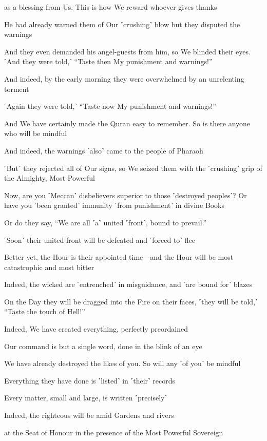 as a blessing from Us. This is how We reward whoever gives thanks

He had already warned them of Our ˹crushing˺ blow but they disputed the warnings

And they even demanded his angel-guests from him, so We blinded their eyes. ˹And they were told,˺ “Taste then My punishment and warnings!”

And indeed, by the early morning they were overwhelmed by an unrelenting torment

˹Again they were told,˺ “Taste now My punishment and warnings!”

And We have certainly made the Quran easy to remember. So is there anyone who will be mindful

And indeed, the warnings ˹also˺ came to the people of Pharaoh

˹But˺ they rejected all of Our signs, so We seized them with the ˹crushing˺ grip of the Almighty, Most Powerful

Now, are you ˹Meccan˺ disbelievers superior to those ˹destroyed peoples˺? Or have you ˹been granted˺ immunity ˹from punishment˺ in divine Books

Or do they say, “We are all ˹a˺ united ˹front˺, bound to prevail.”

˹Soon˺ their united front will be defeated and ˹forced to˺ flee

Better yet, the Hour is their appointed time—and the Hour will be most catastrophic and most bitter

Indeed, the wicked are ˹entrenched˺ in misguidance, and ˹are bound for˺ blazes

On the Day they will be dragged into the Fire on their faces, ˹they will be told,˺ “Taste the touch of Hell!”

Indeed, We have created everything, perfectly preordained

Our command is but a single word, done in the blink of an eye

We have already destroyed the likes of you. So will any ˹of you˺ be mindful

Everything they have done is ˹listed˺ in ˹their˺ records

Every matter, small and large, is written ˹precisely˺

Indeed, the righteous will be amid Gardens and rivers

at the Seat of Honour in the presence of the Most Powerful Sovereign


